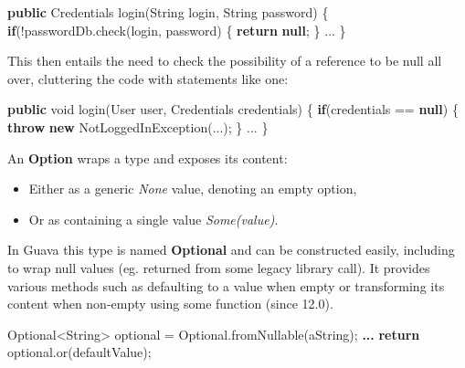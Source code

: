 \documentclass[11pt,]{article}
\newenvironment{Shaded}{}{}
\newcommand{\KeywordTok}[1]{\textcolor[rgb]{0.00,0.44,0.13}{\textbf{{#1}}}}
\newcommand{\DataTypeTok}[1]{\textcolor[rgb]{0.56,0.13,0.00}{{#1}}}
\newcommand{\FunctionTok}[1]{\textcolor[rgb]{0.02,0.16,0.49}{{#1}}}
\newcommand{\NormalTok}[1]{{#1}}
\begin{document}
\begin{Shaded}
\begin{Highlighting}[]
\KeywordTok{public} \NormalTok{Credentials }\FunctionTok{login}\NormalTok{(String login, String password) \{}
  \KeywordTok{if}\NormalTok{(!passwordDb.}\FunctionTok{check}\NormalTok{(login, password) \{}
     \KeywordTok{return} \KeywordTok{null}\NormalTok{;}
  \NormalTok{\}}
  \NormalTok{...}
\NormalTok{\}}
\end{Highlighting}
\end{Shaded}

This then entails the need to check the possibility of a reference to be
null all over, cluttering the code with statements like one:

\begin{Shaded}
\begin{Highlighting}[]
\KeywordTok{public} \DataTypeTok{void} \FunctionTok{login}\NormalTok{(User user, Credentials credentials) \{}
  \KeywordTok{if}\NormalTok{(credentials == }\KeywordTok{null}\NormalTok{) \{}
     \KeywordTok{throw} \KeywordTok{new} \FunctionTok{NotLoggedInException}\NormalTok{(...);}
  \NormalTok{\}}
  \NormalTok{...}
\NormalTok{\}}
\end{Highlighting}
\end{Shaded}

An \textbf{Option} wraps a type and exposes its content:

\begin{itemize}
\item
  Either as a generic \emph{None} value, denoting an empty option,
\item
  Or as containing a single value \emph{Some(value)}.
\end{itemize}

In Guava this type is named \textbf{Optional} and can be constructed
easily, including to wrap null values (eg. returned from some legacy
library call). It provides various methods such as defaulting to a value
when empty or transforming its content when non-empty using some
function (since 12.0).

\begin{Shaded}
\begin{Highlighting}[]
\NormalTok{Optional<String> optional = Optional.}\FunctionTok{fromNullable}\NormalTok{(aString);}
\KeywordTok{... }
\KeywordTok{return} \NormalTok{optional.}\FunctionTok{or}\NormalTok{(defaultValue); }
\end{Highlighting}
\end{Shaded}
\end{document}
